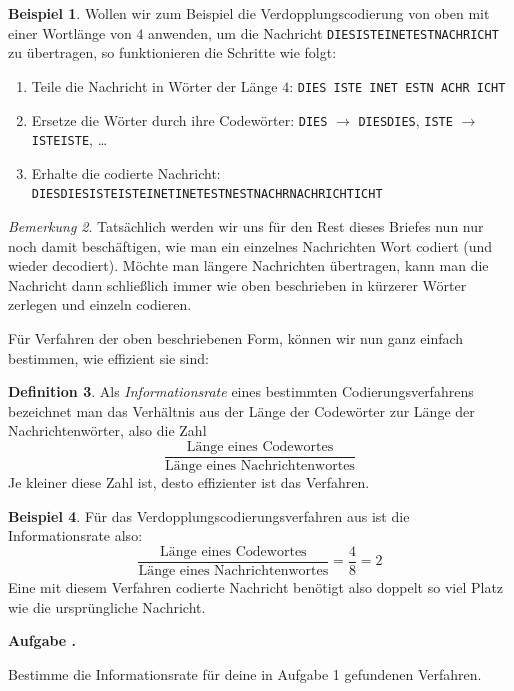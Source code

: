 \documentclass[a4paper,ngerman,12pt]{scrartcl}
\theoremstyle{definition}
\newtheorem{defn}{Definition}[]
\newtheorem{bsp}[defn]{Beispiel}
\theoremstyle{plain}
\theoremstyle{remark}
\newtheorem{bem}[defn]{Bemerkung}
\newlength{\aufgabenskip}
\newcounter{aufgabennummer}
\newenvironment{aufgabe}[1]{
	\addtocounter{aufgabennummer}{1}
	\textbf{Aufgabe \theaufgabennummer.} \emph{#1} \par
}{\vspace{\aufgabenskip}}
\begin{document}
\begin{bsp}\label{bsp:Verdopplungscodierung}
	Wollen wir zum Beispiel die Verdopplungscodierung von oben mit einer Wortlänge von $4$ anwenden, um die Nachricht \texttt{DIESISTEINETESTNACHRICHT} zu übertragen, so funktionieren die Schritte wie folgt:
	\begin{enumerate}
		\item Teile die Nachricht in Wörter der Länge $4$: \texttt{DIES ISTE INET ESTN ACHR ICHT}
		\item Ersetze die Wörter durch ihre Codewörter: \texttt{DIES} $\rightarrow$ \texttt{DIESDIES}, \texttt{ISTE} $\rightarrow$ \texttt{ISTEISTE}, \dots
		\item Erhalte die codierte Nachricht: \texttt{DIESDIESISTEISTEINETINETESTNESTNACHRNACHRICHTICHT}
	\end{enumerate}
\end{bsp}

\begin{bem}
	Tatsächlich werden wir uns für den Rest dieses Briefes nun nur noch damit beschäftigen, wie man ein einzelnes Nachrichten Wort codiert (und wieder decodiert). Möchte man längere Nachrichten übertragen, kann man die Nachricht dann schließlich immer wie oben beschrieben in kürzerer Wörter zerlegen und einzeln codieren.
\end{bem}

Für Verfahren der oben beschriebenen Form, können wir nun ganz einfach bestimmen, wie effizient sie sind:

\begin{defn}
	Als \emph{Informationsrate} eines bestimmten Codierungsverfahrens bezeichnet man das Verhältnis aus der Länge der Codewörter zur Länge der Nachrichtenwörter, also die Zahl
		\[\frac{\text{Länge eines Codewortes}}{\text{Länge eines Nachrichtenwortes}}\]
	Je kleiner diese Zahl ist, desto effizienter ist das Verfahren.
\end{defn}

\begin{bsp}
	Für das Verdopplungscodierungsverfahren aus  ist die Informationsrate also:
		\[\frac{\text{Länge eines Codewortes}}{\text{Länge eines Nachrichtenwortes}} = \frac{4}{8} = 2\]
	Eine mit diesem Verfahren codierte Nachricht benötigt also doppelt so viel Platz wie die ursprüngliche Nachricht.
\end{bsp}

\begin{aufgabe}{}\label{aufgabe:verdreifachungsCodierungIR}
	Bestimme die Informationsrate für deine in Aufgabe 1 gefundenen Verfahren.
\end{aufgabe}
\end{document}

